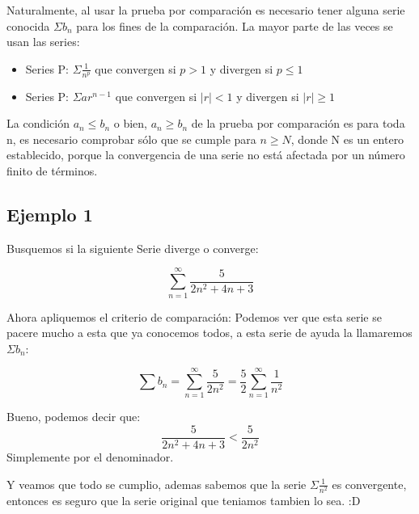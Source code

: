 \documentclass[12pt]{report}							    %
\begin{document}
    Naturalmente, al usar la prueba por comparación es necesario tener alguna serie conocida $\Sigma b_n$
    para los fines de la comparación. La mayor parte de las veces se usan las series:

    \begin{itemize}
        \item Series P: $\Sigma \frac{1}{n^p}$ que convergen si $p>1$ y divergen si $p\leq 1$
        \item Series P: $\Sigma ar^{n-1}$ que convergen si $|r|<1$ y divergen si $|r|\geq 1$
    \end{itemize}

    La condición $a_n \leq b_n$ o bien, $a_n \geq b_n$ de la prueba por comparación es para toda n, es
    necesario comprobar sólo que se cumple para $n \geq N$, donde N es un entero establecido, porque
    la convergencia de una serie no está afectada por un número finito de términos.

    \subsection{Ejemplo 1}
    Busquemos si la siguiente Serie diverge o converge:

    \begin{equation*}
        \sum_{n=1}^{\infty} \frac{5}{2n^2 +4n +3}
    \end{equation*}

    Ahora apliquemos el criterio de comparación: Podemos ver que esta serie se pacere mucho a esta
    que ya conocemos todos, a esta serie de ayuda la llamaremos $\Sigma b_n$:

    \begin{equation*}
        \sum b_n = \sum_{n=1}^{\infty} \frac{5}{2n^2} = \frac{5}{2}\sum_{n=1}^{\infty} \frac{1}{n^2}
    \end{equation*}

    Bueno, podemos decir que:
    \begin{equation*}
        \frac{5}{2n^2 +4n +3} < \frac{5}{2n^2}
    \end{equation*}
    Simplemente por el denominador.

    Y veamos que todo se cumplio, ademas sabemos que la serie $\Sigma \frac{1}{n^2}$ es convergente,
    entonces es seguro que la serie original que teniamos tambien lo sea. :D
\end{document}
